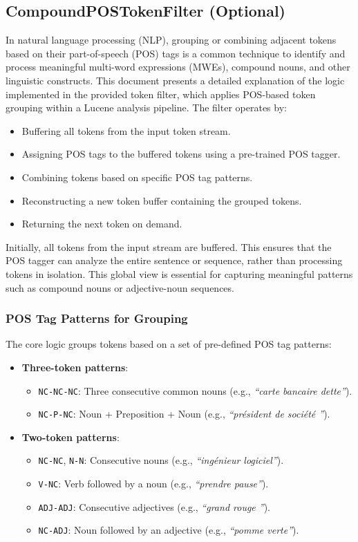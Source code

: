 \subsection{CompoundPOSTokenFilter (Optional)}
In natural language processing (NLP), grouping or combining adjacent tokens based on their part-of-speech (POS) tags is a common technique to identify and process meaningful multi-word expressions (MWEs), compound nouns, and other linguistic constructs. This document presents a detailed explanation of the logic implemented in the provided token filter, which applies POS-based token grouping within a Lucene analysis pipeline.
The filter operates by:
\begin{itemize}
    \item Buffering all tokens from the input token stream.
    \item Assigning POS tags to the buffered tokens using a pre-trained POS tagger.
    \item Combining tokens based on specific POS tag patterns.
    \item Reconstructing a new token buffer containing the grouped tokens.
    \item Returning the next token on demand.
\end{itemize}

Initially, all tokens from the input stream are buffered. This ensures that the POS tagger can analyze the entire sentence or sequence, rather than processing tokens in isolation. This global view is essential for capturing meaningful patterns such as compound nouns or adjective-noun sequences.

\subsubsection{POS Tag Patterns for Grouping}

The core logic groups tokens based on a set of pre-defined POS tag patterns:
\begin{itemize}
    \item \textbf{Three-token patterns}:
    \begin{itemize}
        \item \texttt{NC-NC-NC}: Three consecutive common nouns (e.g., \textit{``carte bancaire dette''}).
        \item \texttt{NC-P-NC}: Noun + Preposition + Noun (e.g., \textit{``président de société ''}).
    \end{itemize}
    \item \textbf{Two-token patterns}:
    \begin{itemize}
        \item \texttt{NC-NC}, \texttt{N-N}: Consecutive nouns (e.g., \textit{``ingénieur logiciel''}).
        \item \texttt{V-NC}: Verb followed by a noun (e.g., \textit{``prendre pause''}).
        \item \texttt{ADJ-ADJ}: Consecutive adjectives (e.g., \textit{``grand rouge ''}).
        \item \texttt{NC-ADJ}: Noun followed by an adjective (e.g., \textit{``pomme verte''}).
    \end{itemize}
\end{itemize}

